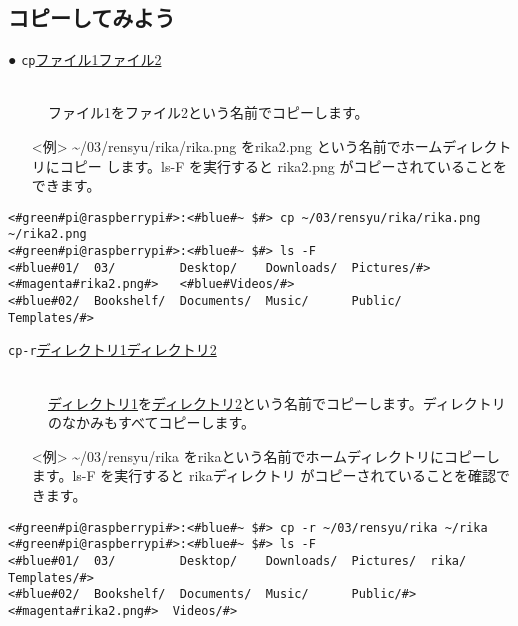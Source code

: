 \subsection{コピーしてみよう}
\begin{description}
\item[● \texttt{cp}\textvisiblespace \underline{ファイル1}\textvisiblespace \underline{ファイル2}]\mbox{}\\
ファイル1をファイル2という名前でコピーします。
\end{description}
\begin{itemize}
\item[<例>]\textasciitilde /03/rensyu/rika/rika.png をrika2.png という名前でホームディレクトリにコピー
します。ls\textvisiblespace -F を実行すると rika2.png がコピーされていることをできます。
\end{itemize}
\begin{lstlisting}[caption=cpの例, label=cp]
<#green#pi@raspberrypi#>:<#blue#~ $#> cp ~/03/rensyu/rika/rika.png ~/rika2.png
<#green#pi@raspberrypi#>:<#blue#~ $#> ls -F
<#blue#01/  03/         Desktop/    Downloads/  Pictures/#>  <#magenta#rika2.png#>   <#blue#Videos/#>
<#blue#02/  Bookshelf/  Documents/  Music/      Public/    Templates/#>
\end{lstlisting}
\begin{description}
\item[\texttt{cp}\textvisiblespace \texttt{-r}\textvisiblespace \underline{ディレクトリ1}\textvisiblespace \underline{ディレクトリ2}]\mbox{}\\
\underline{ディレクトリ1}を\underline{ディレクトリ2}という名前でコピーします。ディレクトリのなかみもすべてコピーします。
\end{description}
\begin{itemize}
\item[<例>]\textasciitilde /03/rensyu/rika をrikaという名前でホームディレクトリにコピーします。ls\textvisiblespace -F を実行すると rikaディレクトリ がコピーされていることを確認できます。
\end{itemize}
\begin{lstlisting}[caption=cp -rの例, label=cp-R]
<#green#pi@raspberrypi#>:<#blue#~ $#> cp -r ~/03/rensyu/rika ~/rika
<#green#pi@raspberrypi#>:<#blue#~ $#> ls -F
<#blue#01/  03/         Desktop/    Downloads/  Pictures/  rika/      Templates/#>
<#blue#02/  Bookshelf/  Documents/  Music/      Public/#>    <#magenta#rika2.png#>  Videos/#>
\end{lstlisting}

